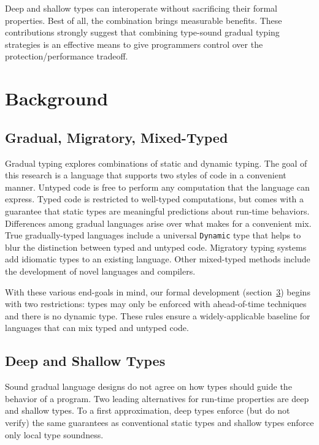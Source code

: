 \documentclass[screen=true, natbib=false, 10pt, sigplan]{acmart}
\newcommand{\sectionNewpage}{}
\newcommand{\ChapRef}[2]{\SecRef{#1}{#2}}
\newcommand{\SecRef}[2]{section~#1}
\newcommand{\SectionNumberLink}[2]{\hyperref[#1]{#2}}
\newcommand{\Scribtexttt}[1]{{\texttt{#1}}}
\let\SOriginalthesubsection\thesubsection
\let\SOriginalthesubsubsection\thesubsubsection
\newcommand{\Ssection}[2]{\section[#1]{#2}\let\thesubsection\SOriginalthesubsection}
\newcommand{\Ssubsection}[2]{\subsection[#1]{#2}\let\thesubsubsection\SOriginalthesubsubsection}
\begin{document}
\noindent Deep and shallow types can interoperate without sacrificing their
formal properties.
Best of all, the combination brings measurable benefits.
These contributions strongly suggest that combining
type{-}sound gradual typing strategies is an effective means to give programmers
control over the protection/performance tradeoff.

\sectionNewpage

\Ssection{Background}{Background}\label{t:x28part_x22secx3abackgroundx22x29}



\Ssubsection{Gradual, Migratory, Mixed{-}Typed}{Gradual, Migratory, Mixed{-}Typed}\label{t:x28part_x22Gradualx5fx5fMigratoryx5fx5fMixedx2dTypedx22x29}

Gradual typing explores combinations of static and dynamic
typing.
The goal of this research is a language that supports two styles of code in a
convenient manner.
Untyped code is free to perform any computation that the language can express.
Typed code is restricted to well{-}typed computations, but comes
with a guarantee that static types are meaningful predictions about run{-}time
behaviors.
Differences among gradual languages arise
over what makes for a convenient mix.
True gradually{-}typed languages include a universal \Scribtexttt{Dynamic} type that
helps to blur the distinction between typed and untyped code.
Migratory typing systems add
idiomatic types to an existing language.
Other mixed{-}typed methods include the development of
novel
languages
and compilers.

With these various end{-}goals in mind, our formal development
(\ChapRef{\SectionNumberLink{t:x28part_x22secx3amodelx22x29}{3}}{Model and Metatheory}) begins with two restrictions:
types may only be enforced with ahead{-}of{-}time techniques and
there is no dynamic type.
These rules ensure a widely{-}applicable baseline for languages
that can mix typed and untyped code.

\Ssubsection{Deep and Shallow Types}{Deep and Shallow Types}\label{t:x28part_x22secx3abackgroundx3adeepx2dshallowx22x29}

Sound gradual language designs do not agree on how types should guide the
behavior of a program.
Two leading alternatives for run{-}time properties are deep and shallow types.
To a first approximation, deep types enforce (but do not verify) the same
guarantees as conventional static types and shallow types enforce only
local type soundness.
\end{document}
